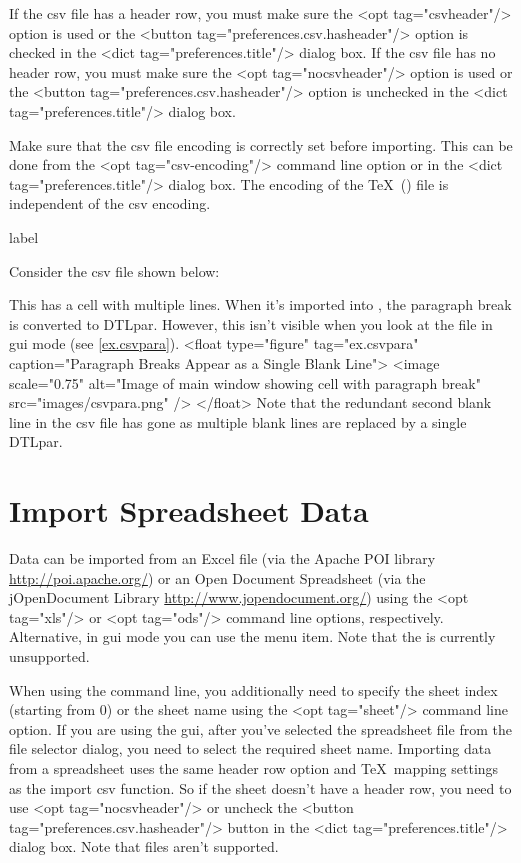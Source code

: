    If the \gls{csv} file has a header row, you must make sure 
   the <opt tag="csvheader"/> option is used or the 
   <button tag="preferences.csv.hasheader"/> option is checked in the
   <dict tag="preferences.title"/> dialog box.
   If the \gls{csv} file has no header row, you must make sure 
   the <opt tag="nocsvheader"/> option is used or the 
   <button tag="preferences.csv.hasheader"/> option is unchecked in the
   <dict tag="preferences.title"/> dialog box.


   Make sure that the \gls{csv} file encoding is correctly set
   before importing. This can be done from the <opt tag="csv-encoding"/>
   command line option or in the 
   <dict tag="preferences.title"/> dialog box. The encoding
   of the \TeX\ () file is independent of the \gls{csv}
   encoding.

\begin{example}{label}{}

   Consider the \gls{csv} file shown below:


   This has a cell with multiple lines. When it's imported into
   , the paragraph break is converted to \gls{DTLpar}.
   However, this isn't visible when you look at the file in 
   \gls{gui} mode (see \autoref{ex.csvpara}).
     <float type="figure" tag="ex.csvpara" caption="Paragraph Breaks Appear as a Single Blank Line">
      <image scale="0.75" alt="Image of main window showing cell with paragraph break" src="images/csvpara.png" />
     </float>
   Note that the redundant second blank line in the \gls{csv} file
   has gone as multiple blank lines are replaced by a single
   \gls{DTLpar}.
\end{example}

\section{Import Spreadsheet Data}\label{importspread}

   Data can be imported from an Excel  file (via the 
   Apache POI library \url{http://poi.apache.org/})
   or an Open Document Spreadsheet (via the jOpenDocument Library
   \url{http://www.jopendocument.org/}) using the
   <opt tag="xls"/> or <opt tag="ods"/> command line options, respectively.
   Alternative, in \gls{gui} mode you can use the 
    menu item.
   Note that the  is currently unsupported.

 When using the command line,
   you additionally need to specify the sheet index (starting from 0) or the 
   sheet name using the <opt tag="sheet"/> command line option. If you are 
   using the \gls{gui}, after you've selected the spreadsheet file 
   from the file selector dialog, you need to select the required sheet 
   name.
Importing data from a spreadsheet uses the same header row option and 
   \TeX\ mapping settings as the import \gls{csv} function. 
   So if the sheet doesn't have a header row, you need to use
   <opt tag="nocsvheader"/> or uncheck the <button tag="preferences.csv.hasheader"/> button 
   in the <dict tag="preferences.title"/> dialog box. Note that 
    files aren't supported.


